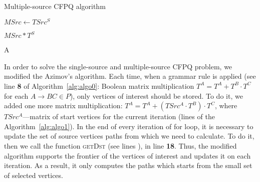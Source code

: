 \begin{algorithm}
\small
\begin{algorithmic}[1]
\caption{Multiple-source CFPQ algorithm}
\label{alg:algo1}


     
    \EndFor

    \State $MSrc \gets TSrc^S$

     
        \EndFor
    \EndFor

     
        \EndFor
    \EndWhile
    \State \Return $MSrc * T^S$
\EndFunction



    \EndFor
    \State \Return A
\EndFunction
\end{algorithmic}
\end{algorithm}

In order to solve the single-source and multiple-source CFPQ problem, we modified the Azimov's algorithm.
Each time, when a grammar rule is applied (see line \textbf{8} of Algorithm~\ref{alg:algo0}: Boolean matrix multiplication $T^A = T^A + T^B \cdot T^C$ for each $A \rightarrow BC \in P$), only vertices of interest should be stored.
To do it, we added one more matrix multiplication: $T^A = T^A + (TSrc^A \cdot T^B) \cdot T^ C$, where $TSrc^A$---matrix of start vertices for the current iteration (lines \textbf{} of the Algorithm~\ref{alg:algo1}).
In the end of every iteration of for loop, it is necessary to update the set of source vertices paths from which we need to calculate.
To do it, then we call the function \textsc{getDst} (see lines \textbf{}), in line \textbf{18}.
Thus, the modified algorithm supports the frontier of the vertices of interest and updates it on each iteration.
As a result, it only computes the paths which starts from the small set of selected vertices.

